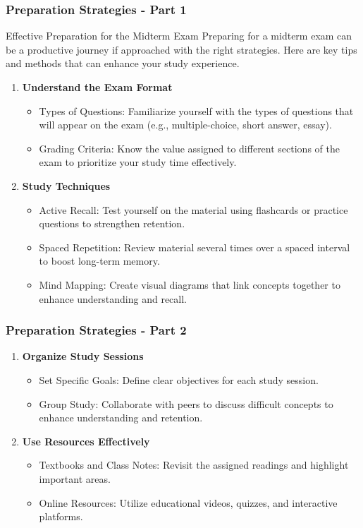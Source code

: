 \documentclass[aspectratio=169]{beamer}
\begin{document}
\begin{frame}[fragile]
    \frametitle{Preparation Strategies - Part 1}
    \begin{block}{Effective Preparation for the Midterm Exam}
        Preparing for a midterm exam can be a productive journey if approached with the right strategies. Here are key tips and methods that can enhance your study experience.
    \end{block}
    \begin{enumerate}
        \item \textbf{Understand the Exam Format}
        \begin{itemize}
            \item Types of Questions: Familiarize yourself with the types of questions that will appear on the exam (e.g., multiple-choice, short answer, essay).
            \item Grading Criteria: Know the value assigned to different sections of the exam to prioritize your study time effectively.
        \end{itemize}
        
        \item \textbf{Study Techniques}
        \begin{itemize}
            \item Active Recall: Test yourself on the material using flashcards or practice questions to strengthen retention.
            \item Spaced Repetition: Review material several times over a spaced interval to boost long-term memory.
            \item Mind Mapping: Create visual diagrams that link concepts together to enhance understanding and recall.
        \end{itemize}
    \end{enumerate}
\end{frame}

\begin{frame}[fragile]
    \frametitle{Preparation Strategies - Part 2}
    \begin{enumerate}[resume]
        \item \textbf{Organize Study Sessions}
        \begin{itemize}
            \item Set Specific Goals: Define clear objectives for each study session.
            \item Group Study: Collaborate with peers to discuss difficult concepts to enhance understanding and retention.
        \end{itemize}

        \item \textbf{Use Resources Effectively}
        \begin{itemize}
            \item Textbooks and Class Notes: Revisit the assigned readings and highlight important areas.
            \item Online Resources: Utilize educational videos, quizzes, and interactive platforms.
        \end{itemize}
    \end{enumerate}
\end{frame}
\end{document}
